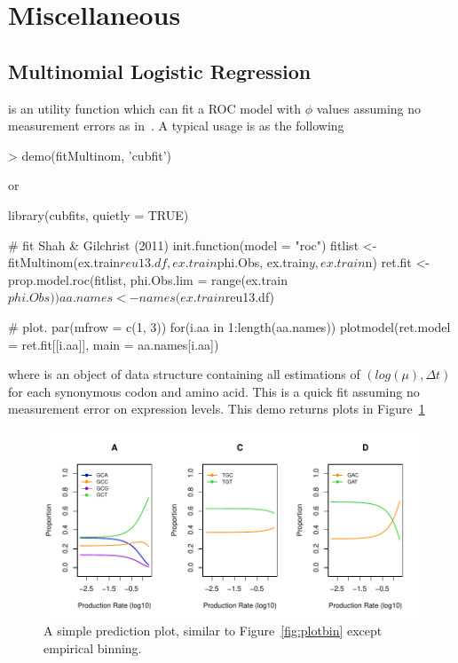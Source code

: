 
\section[Miscellaneous]{Miscellaneous}
\label{sec:misc}


\subsection[Multinomial Logistic Regression]{Multinomial Logistic Regression}
\label{sec:multinom}


 is an utility function which can fit a ROC model with
$\phi$ values assuming no measurement errors as in~\cite{Shah2011}.
A typical usage is as the following
\begin{Code}
> demo(fitMultinom, 'cubfit')
\end{Code}
or
\begin{Code}
library(cubfits, quietly = TRUE)

# fit Shah & Gilchrist (2011)
init.function(model = "roc")
fitlist <- fitMultinom(ex.train$reu13.df, ex.train$phi.Obs,
                       ex.train$y, ex.train$n)
ret.fit <- prop.model.roc(fitlist, phi.Obs.lim = range(ex.train$phi.Obs))
aa.names <- names(ex.train$reu13.df)

# plot.
par(mfrow = c(1, 3))
for(i.aa in 1:length(aa.names)){
  plotmodel(ret.model = ret.fit[[i.aa]], main = aa.names[i.aa])
}
\end{Code}
where  is an object of  data structure containing
all estimations of $(log(\mu), \Delta t)$ for each synonymous codon and
amino acid.
This is a quick fit assuming no measurement error on expression levels.
This demo returns plots in Figure~\ref{fig:fitMultinom}
\begin{figure}[ht]
\centering
\includegraphics[width=6in]{cubfits-include/figure/fitMultinom}
\caption{A simple prediction plot, similar to Figure~\ref{fig:plotbin}
except empirical binning.
}
\label{fig:fitMultinom}
\end{figure}

